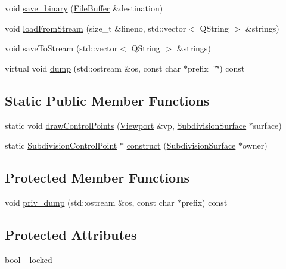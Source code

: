 \begin{DoxyCompactItemize}
\item 
void \hyperlink{classShipCADGeometry_1_1SubdivisionControlPoint_a7de1a32ae9e845478ec1bd5eaec17cd1}{save\-\_\-binary} (\hyperlink{classShipCADGeometry_1_1FileBuffer}{File\-Buffer} \&destination)
\item 
void \hyperlink{classShipCADGeometry_1_1SubdivisionControlPoint_a09769bfb0b63980387c23736081acdf1}{load\-From\-Stream} (size\-\_\-t \&lineno, std\-::vector$<$ Q\-String $>$ \&strings)
\item 
void \hyperlink{classShipCADGeometry_1_1SubdivisionControlPoint_a60cc866bff57473700fbea4e17adcb4d}{save\-To\-Stream} (std\-::vector$<$ Q\-String $>$ \&strings)
\item 
virtual void \hyperlink{classShipCADGeometry_1_1SubdivisionControlPoint_a4a9d6e45291c27f19f0d76c9b9d19048}{dump} (std\-::ostream \&os, const char $\ast$prefix=\char`\"{}\char`\"{}) const 
\end{DoxyCompactItemize}
\subsection*{Static Public Member Functions}
\begin{DoxyCompactItemize}
\item 
static void \hyperlink{classShipCADGeometry_1_1SubdivisionControlPoint_a761599371138b34be2c7a2cac3699e2c}{draw\-Control\-Points} (\hyperlink{classShipCADGeometry_1_1Viewport}{Viewport} \&vp, \hyperlink{classShipCADGeometry_1_1SubdivisionSurface}{Subdivision\-Surface} $\ast$surface)
\item 
static \hyperlink{classShipCADGeometry_1_1SubdivisionControlPoint}{Subdivision\-Control\-Point} $\ast$ \hyperlink{classShipCADGeometry_1_1SubdivisionControlPoint_adc189f3e5cff85ecd1a59356e0f7d63d}{construct} (\hyperlink{classShipCADGeometry_1_1SubdivisionSurface}{Subdivision\-Surface} $\ast$owner)
\end{DoxyCompactItemize}
\subsection*{Protected Member Functions}
\begin{DoxyCompactItemize}
\item 
void \hyperlink{classShipCADGeometry_1_1SubdivisionControlPoint_a01e1eff38ecb4393948db0d9883cad84}{priv\-\_\-dump} (std\-::ostream \&os, const char $\ast$prefix) const 
\end{DoxyCompactItemize}
\subsection*{Protected Attributes}
\begin{DoxyCompactItemize}
\item 
bool \hyperlink{classShipCADGeometry_1_1SubdivisionControlPoint_a65710e5c15163d01dcfdb562abb23103}{\-\_\-locked}
\end{DoxyCompactItemize}
